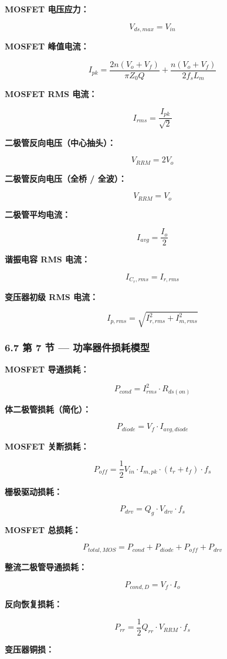 \documentclass[UTF8]{ctexart}
\begin{document}
\textbf{MOSFET 电压应力：}

\[
V_{ds,max} = V_{in}
\]

\textbf{MOSFET 峰值电流：}

\[
I_{pk} = \frac{2n(V_o + V_f)}{\pi Z_0 Q} + \frac{n(V_o + V_f)}{2 f_s L_m}
\]

\textbf{MOSFET RMS 电流：}

\[
I_{rms} = \frac{I_{pk}}{\sqrt{2}}
\]

\textbf{二极管反向电压（中心抽头）：}

\[
V_{RRM} = 2V_o
\]

\textbf{二极管反向电压（全桥 / 全波）：}

\[
V_{RRM} = V_o
\]

\textbf{二极管平均电流：}

\[
I_{avg} = \frac{I_o}{2}
\]

\textbf{谐振电容 RMS 电流：}

\[
I_{C_r,rms} = I_{r,rms}
\]

\textbf{变压器初级 RMS 电流：}

\[
I_{p,rms} = \sqrt{I_{r,rms}^2 + I_{m,rms}^2}
\]

\subsubsection*{6.7 第 7 节 — 功率器件损耗模型}

\textbf{MOSFET 导通损耗：}

\[
P_{cond} = I_{rms}^2 \cdot R_{ds(on)}
\]

\textbf{体二极管损耗（简化）：}

\[
P_{diode} = V_f \cdot I_{avg,diode}
\]

\textbf{MOSFET 关断损耗：}

\[
P_{off} = \frac{1}{2} V_{in} \cdot I_{m,pk} \cdot (t_r + t_f) \cdot f_s
\]

\textbf{栅极驱动损耗：}

\[
P_{drv} = Q_g \cdot V_{drv} \cdot f_s
\]

\textbf{MOSFET 总损耗：}

\[
P_{total,MOS} = P_{cond} + P_{diode} + P_{off} + P_{drv}
\]

\textbf{整流二极管导通损耗：}

\[
P_{cond,D} = V_f \cdot I_o
\]

\textbf{反向恢复损耗：}

\[
P_{rr} = \frac{1}{2} Q_{rr} \cdot V_{RRM} \cdot f_s
\]

\textbf{变压器铜损：}
\end{document}
